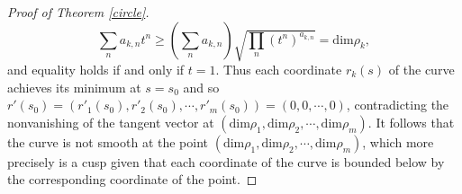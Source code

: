 \documentclass[11pt]{amsart}
\theoremstyle{plain}
\theoremstyle{definition}
\newtheorem{remark}[theorem]{Remark}
\begin{document}
\begin{proof}[Proof of Theorem \ref{circle}]
\[\displaystyle\sum_n a_{k, n}t^n\geq\left(\sum_n a_{k, n}\right)\sqrt{\prod_n (t^n)^{a_{k, n}}}=\text{dim}\rho_k,\] 
and equality holds if and only if $t=1$. Thus each coordinate $r_k(s)$ of the curve achieves its minimum at $s=s_0$ and so $r'(s_0)=(r'_1(s_0), r'_2(s_0), \cdots, r'_m(s_0))=(0, 0, \cdots, 0)$, contradicting the nonvanishing of the tangent vector at $(\text{dim}\rho_1, \text{dim}\rho_2, \cdots, \text{dim}\rho_m)$. It follows that the curve is not smooth at the point $(\text{dim}\rho_1, \text{dim}\rho_2, \cdots, \text{dim}\rho_m)$, which more precisely is a cusp given that each coordinate of the curve is bounded below by the corresponding coordinate of the point.
\end{proof}
	
\end{document}
